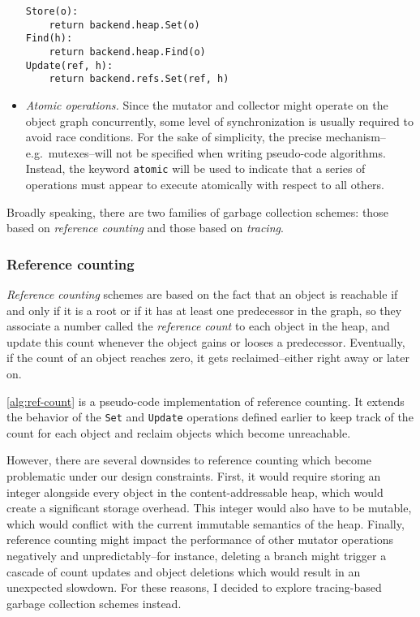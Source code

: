\begin{itemize}
        \begin{verbatim}
Store(o):
    return backend.heap.Set(o)
Find(h):
    return backend.heap.Find(o)
Update(ref, h):
    return backend.refs.Set(ref, h)
\end{verbatim}

  \item\emph{Atomic operations.}
        Since the mutator and collector might operate on the object graph concurrently, some level of synchronization is usually required to avoid race conditions. For the sake of simplicity, the precise mechanism--e.g.~mutexes--will not be specified when writing pseudo-code algorithms. Instead, the keyword \texttt{atomic} will be used to indicate that a series of operations must appear to execute atomically with respect to all others.

\end{itemize}

Broadly speaking, there are two families of garbage collection schemes: those based on \emph{reference counting} and those based on \emph{tracing}.

\subsubsection{Reference counting}

\emph{Reference counting} schemes are based on the fact that an object is reachable if and only if it is a root or if it has at least one predecessor in the graph, so they associate a number called the \emph{reference count} to each object in the heap, and update this count whenever the object gains or looses a predecessor. Eventually, if the count of an object reaches zero, it gets reclaimed--either right away or later on.

\cref{alg:ref-count} is a pseudo-code implementation of reference counting. It extends the behavior of the \texttt{Set} and \texttt{Update} operations defined earlier to keep track of the count for each object and reclaim objects which become unreachable.



\newpage
However, there are several downsides to reference counting which become problematic under our design constraints. First, it would require storing an integer alongside every object in the content-addressable heap, which would create a significant storage overhead. This integer would also have to be mutable, which would conflict with the current immutable semantics of the heap. Finally, reference counting might impact the performance of other mutator operations negatively and unpredictably--for instance, deleting a branch might trigger a cascade of count updates and object deletions which would result in an unexpected slowdown. For these reasons, I decided to explore tracing-based garbage collection schemes instead.

